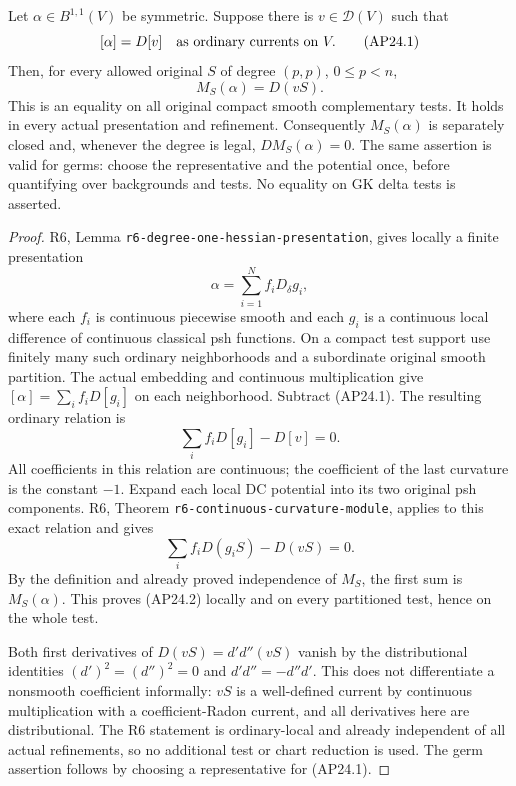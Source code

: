 \begin{proposition}
Let \(\alpha\in B^{1,1}(V)\) be symmetric.  Suppose there is
\(v\in\mathcal D(V)\) such that
\[
                         [\alpha]=D[v]
             \quad\hbox{as ordinary currents on }V.       \tag{AP24.1}
\]
Then, for every allowed original \(S\) of degree \((p,p)\),
\(0\le p<n\),
\[
                         M_S(\alpha)=D(vS).               \tag{AP24.2}
\]
This is an equality on all original compact smooth complementary
tests.  It holds in every actual presentation and refinement.
Consequently \(M_S(\alpha)\) is separately closed and, whenever
the degree is legal, \(D M_S(\alpha)=0\).
The same assertion is valid for germs: choose the representative
and the potential once, before quantifying over backgrounds and
tests.  No equality on GK delta tests is asserted.
\end{proposition}

\begin{proof}
R6, Lemma \texttt{r6-degree-one-hessian-presentation}, gives
locally a finite presentation
\[
                  \alpha=\sum_{i=1}^{N} f_iD_\delta g_i,
                                                               \tag{AP24.3}
\]
where each \(f_i\) is continuous piecewise smooth and each
\(g_i\) is a continuous local difference of continuous classical
psh functions.  On a compact test support use finitely many such
ordinary neighborhoods and a subordinate original smooth partition.
The actual embedding and continuous multiplication give
\(
 [\alpha]=\sum_i f_iD[g_i]
\)
on each neighborhood.  Subtract (AP24.1).  The resulting ordinary
relation is
\[
                     \sum_i f_iD[g_i]-D[v]=0 .             \tag{AP24.4}
\]
All coefficients in this relation are continuous; the coefficient
of the last curvature is the constant \(-1\).
Expand each local DC potential into its two original psh components.
R6, Theorem \texttt{r6-continuous-curvature-module}, applies to
this exact relation and gives
\[
                     \sum_i f_iD(g_iS)-D(vS)=0 .           \tag{AP24.5}
\]
By the definition and already proved independence of \(M_S\),
the first sum is \(M_S(\alpha)\).  This proves (AP24.2)
locally and on every partitioned test, hence on the whole test.

Both first derivatives of \(D(vS)=d'd''(vS)\) vanish by the
distributional identities \((d')^2=(d'')^2=0\) and
\(d'd''=-d''d'\).  This does not differentiate a nonsmooth
coefficient informally: \(vS\) is a well-defined current by
continuous multiplication with a coefficient-Radon current, and
all derivatives here are distributional.  The R6 statement is
ordinary-local and already independent of all actual refinements,
so no additional test or chart reduction is used.  The germ
assertion follows by choosing a representative for (AP24.1).
\end{proof}

